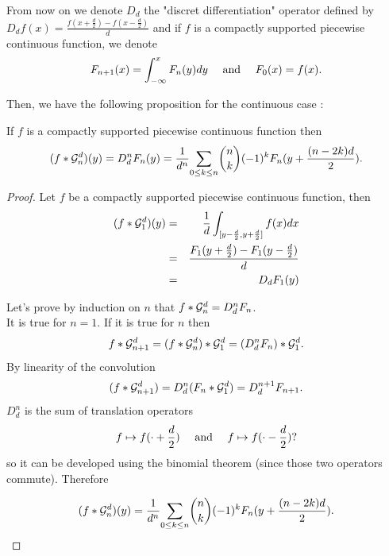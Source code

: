 From now on we denote $D_d$ the "discret differentiation" operator defined by $D_d f(x)=\frac{f(x+\frac{d}{2})-f(x-\frac{d}{2})}{d}$ and if $f$ is a compactly supported piecewise continuous function, we denote \begin{equation*}
F_{n+1}(x)= \int_{-\infty}^{x}F_{n}(y)dy~~~ \textrm{ and }~~~F_{0}(x)= f(x).
\end{equation*}

Then, we have the following proposition for the continuous case :

\begin{prop} If $f$ is a compactly supported piecewise continuous function then
\begin{equation}
 (f*\mathcal{G}_n^d)(y)=D_d^n F_{n}(y)= \frac{1}{d^n}\underset{0 \le k\le n}{\sum} \binom{n}{k}(-1)^{k} F_{n}(y+\frac{(n-2k)d}{2}).
\end{equation}
\label{continuous_approx}
\end{prop}





\begin{proof}
Let $f$ be a compactly supported piecewise continuous function, then
\begin{eqnarray*}
(f * \mathcal{G}_1^d )(y)&=&\frac{1}{d} \int_{[y-\frac{d}{2},y+\frac{d}{2}]} f(x) dx\\
               &=&\frac{F_{1}(y+\frac{d}{2})-F_{1}(y-\frac{d}{2})}{d}\\
               &=&D_d F_{1}(y)
\end{eqnarray*}


\noindent Let's prove by induction on $n$ that $ f*\mathcal{G}_n^d=D_d^n F_{n}$.\\
It is true for $n=1$. If it is true for $n$ then
\begin{equation*}
f*\mathcal{G}_{n+1}^{d}=(f * \mathcal{G}_{n}^d) * \mathcal{G}_{1}^{d}= (D_d^n F_{n})*\mathcal{G}_1^d.
\end{equation*}
By linearity of the convolution
\begin{equation*}
(f*\mathcal{G}_{n+1}^{d}) = D_d^n (F_{n}*\mathcal{G}_1^d) = D_d^{n+1} F_{n+1}.
\end{equation*}
$D_d^n$ is the sum of translation operators
\begin{equation*}
f\mapsto f(\cdot+\frac{d}{2})~~~\textrm{ and }~~~f\mapsto f(\cdot-\frac{d}{2})?
\end{equation*}
so it can be developed using the binomial theorem (since those two operators commute). Therefore

\begin{equation*}
(f*\mathcal{G}_n^d)(y) = \frac{1}{d^n}\underset{0 \le k\le n}{\sum} \binom{n}{k}(-1)^{k} F_{n}(y+\frac{(n-2k)d}{2}).
\end{equation*}
\end{proof}


